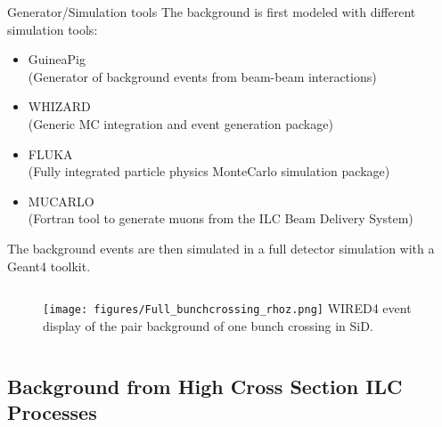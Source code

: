 \documentclass[xcolor={dvipsnames}]{beamer}
\begin{document}
\begin{frame}{Generator/Simulation tools}
The background is first modeled with different simulation tools:\\
\begin{itemize}
\item \alert{GuineaPig}\\(Generator of background events from beam-beam interactions)
\item \alert{WHIZARD}\\(Generic MC integration and event generation package)
\item \alert{FLUKA}\\(Fully integrated particle physics MonteCarlo simulation package)
\item \alert{MUCARLO}\\(Fortran tool to generate muons from the ILC Beam Delivery System)
\end{itemize}
The background events are then simulated in a \alert{full detector simulation} with a Geant4 toolkit.
\begin{figure}
	\begin{columns}
         \flushright
        \texttt{[image: figures/Full\_bunchcrossing\_rhoz.png]}
        {\footnotesize WIRED4 event display of the pair background of one bunch crossing in SiD.}
      \end{columns}
\end{figure}
	
\end{frame}

\subsection{Background from High Cross Section ILC Processes}
\end{document}
